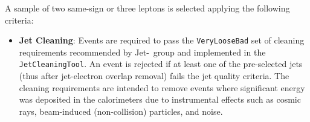 
\par A sample of two same-sign or three leptons is selected applying the following criteria:
\begin{itemize}

    
\item{ \textbf{Jet Cleaning}: Events are required to pass the
  {\tt{VeryLooseBad}} set of cleaning requirements recommended by Jet-\met\ group \cite{jetcctwiki} 
  and implemented in the {\tt{JetCleaningTool}}. 
An event is rejected if at least one of the pre-selected jets (thus
after jet-electron overlap removal) fails the jet quality criteria. 
The cleaning requirements are intended to remove events where significant energy was deposited in
  the calorimeters due to instrumental effects such as cosmic rays,
  beam-induced (non-collision) particles, and noise. } 
  

\end{itemize}
